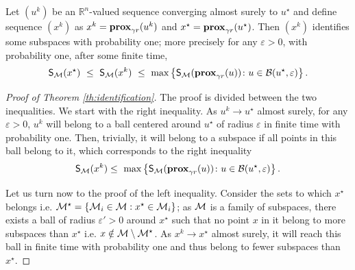\begin{theorem}\label{th:identification}
Let $(u^k)$ be an $\mathbb{R}^n$-valued sequence converging almost surely to $u^\star$ and define sequence $(x^k)$ as $x^k = \mathbf{prox}_{\gamma r}(u^k)$ and  $x^\star =  \mathbf{prox}_{\gamma r}(u^\star)$. Then $(x^k)$ identifies some subspaces with probability one; more precisely for any $\varepsilon>0$, with probability one, after some finite time,
\begin{equation}\label{eq:identification_result}
     \mathsf{S}_{\mathcal{M}}(x^\star) ~\leq~ \mathsf{S}_{\mathcal{M}}(x^k) ~\leq~\max\left\{\mathsf{S}_{\mathcal{M}}(\mathbf{prox}_{\gamma r}(u))\colon u\in\mathcal{B}(u^\star,\varepsilon)\right\}.
\end{equation}
\end{theorem}
\begin{proof}[Proof of Theorem \ref{th:identification}]
The proof is divided between the two inequalities. We start with the right inequality. As $u^k \to u^\star$ almost surely, for any $\varepsilon>0$, $u^k$ will belong to a ball centered around $u^\star$ of radius $\varepsilon$ in finite time with probability one. Then, trivially, it will belong to a subspace if all points in this ball belong to it, which corresponds to the right inequality
\begin{equation}\label{eq:ident_union}
    \mathsf{S}_{\mathcal{M}}(x^k) \leq~\max\left\{\mathsf{S}_{\mathcal{M}}(\mathbf{prox}_{\gamma r}(u))\colon u\in\mathcal{B}(u^\star,\varepsilon)\right\}.
\end{equation}

Let us turn now to the proof of the left inequality.  Consider the sets to which $x^\star$ belongs i.e. $\mathcal{M}^\star = \{ \mathcal{M}_i\in\mathcal{M} : x^\star \in \mathcal{M}_i \}$; as $\mathcal{M}$ is a family of subspaces, there exists a ball of radius $\varepsilon'>0$ around $x^\star$ such that no point $x$ in it belong to {more} subspaces than $x^\star$ i.e. $x \notin \mathcal{M} \setminus \mathcal{M}^\star$. As $x^k \to x^\star $ almost surely, it will reach this ball in finite time with probability one and thus belong to fewer subspaces than $x^\star$.
\end{proof}

